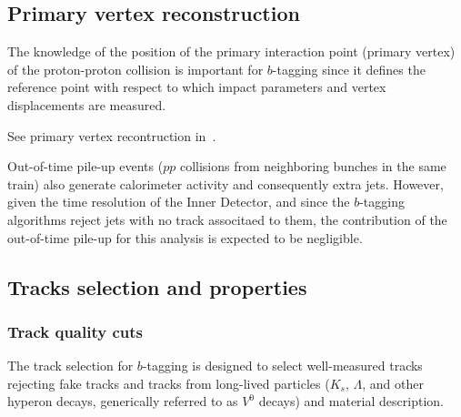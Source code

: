 \begin{itemize}
\subsection{Primary vertex reconstruction}

The knowledge of the position of the primary interaction point (primary vertex) of the proton-proton collision is important for $b$-tagging since it defines the reference point with respect to which impact parameters and vertex displacements are measured.

See primary vertex recontruction in~\cite{ATLAS-CONF-2010-069}.


Out-of-time pile-up events ($pp$ collisions from neighboring bunches in the same train) also generate calorimeter activity and consequently extra jets. However, given the time resolution of the Inner Detector, and since the $b$-tagging algorithms reject jets with no track associtaed to them, the contribution of the out-of-time pile-up for this analysis is expected to be negligible.




\subsection{Tracks selection and properties}\label{sec:ObjSelection}

\subsubsection{Track quality cuts}


The track selection for $b$-tagging is designed to select well-measured tracks rejecting fake tracks and tracks from long-lived particles ($K_s$, $\Lambda$, and other hyperon decays, generically referred to as $V^0$ decays) and material description.


\end{itemize}
